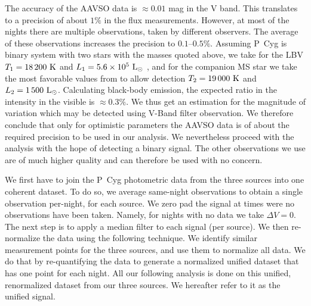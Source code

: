 \documentclass[twocolumn]{aastex62}
\def \K{~\rm{K}}
\def \rmLodot{~\rm{L_{\sun}}}
\begin{document}
The accuracy of the AAVSO data is $\approx 0.01$ mag in the V band.
This translates to a precision of about $1\%$ in the flux measurements.
However, at most of the nights there are multiple observations, taken by different observers. The average of these observations increases the precision to $0.1$--$0.5 \%$.
Assuming P~Cyg is binary system with two stars with the masses quoted above,
we take for the LBV $T_1 = 18\,200 \K$ and $L_1=5.6 \times 10^5 \rmLodot$ \citep{Najarroetal1997}, and for the companion MS star we take the most favorable values from \citep{Kashi2010} to allow detection $T_2 = 19\,000 \K$ and $L_2= 1\,500 \rmLodot$.
Calculating black-body emission, the expected ratio in the intensity in the visible is $\approx 0.3 \%$.
We thus get an estimation for the magnitude of variation which may be detected using V-Band filter observation.
We therefore conclude that only for optimistic parameters the AAVSO data is of about the required precision to be used in our analysis.
We nevertheless proceed with the analysis with the hope of detecting a binary signal.
The other observations we use are of much higher quality and can therefore be used with no concern.

We first have to join the P~Cyg photometric data from the three sources into one coherent dataset.
To do so, we average same-night observations to obtain a single observation per-night, for each source.
We zero pad the signal at times were no observations have been taken.
Namely, for nights with no data we take $\Delta V =0$.
The next step is to apply a median filter to each signal (per source).
We then re-normalize the data using the following technique. We identify similar measurement points for the three sources, and use them to normalize all data.
We do that by re-quantifying the data to generate a normalized unified dataset that has one point for each night.
All our following analysis is done on this unified, renormalized dataset from our three sources. We hereafter refer to it as the unified signal.
\end{document}
